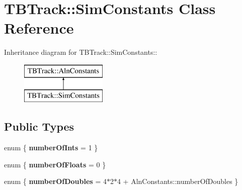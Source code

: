 \section{TBTrack::SimConstants Class Reference}
\label{classTBTrack_1_1SimConstants}
Inheritance diagram for TBTrack::SimConstants::\begin{figure}[H]
\begin{center}
\leavevmode
\includegraphics[height=2cm]{classTBTrack_1_1SimConstants}
\end{center}
\end{figure}
\subsection*{Public Types}
\begin{DoxyCompactItemize}
\item 
enum \{ {\bfseries numberOfInts} = 1
 \}
\item 
enum \{ {\bfseries numberOfFloats} = 0
 \}
\item 
enum \{ {\bfseries numberOfDoubles} = 4$\ast$2$\ast$4 + AlnConstants::numberOfDoubles
 \}
\end{DoxyCompactItemize}
